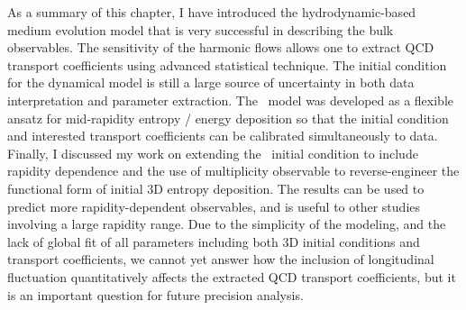 As a summary of this chapter, I have introduced the hydrodynamic-based  medium evolution model that is very successful in describing the bulk observables.
The sensitivity of the harmonic flows allows one to extract QCD transport coefficients using advanced statistical technique.
The initial condition for the dynamical model is still a large source of uncertainty in both data interpretation and parameter extraction.
The \trento\ model was developed as a flexible ansatz for mid-rapidity entropy / energy deposition so that the initial condition and interested transport coefficients can be calibrated simultaneously to data.
Finally, I discussed my work on extending the \trento\ initial condition to include rapidity dependence and the use of multiplicity observable to reverse-engineer the functional form of initial 3D entropy deposition.
The results can be used to predict more rapidity-dependent observables, and is useful to other studies involving a large rapidity range.
Due to the simplicity of the modeling, and the lack of global fit of all parameters including both 3D initial conditions and transport coefficients, we cannot yet answer how the inclusion of longitudinal fluctuation quantitatively affects the extracted QCD transport coefficients, but it is an important question for future precision analysis.